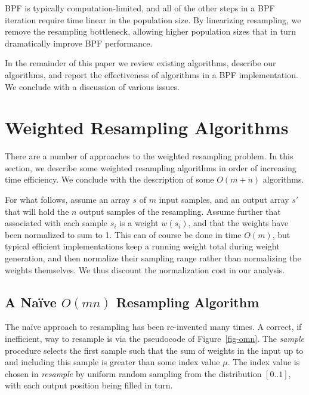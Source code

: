 \documentclass[12pt]{article}
\begin{document}
  BPF is typically computation-limited, and all of the other
  steps in a BPF iteration require time linear in the
  population size.  By linearizing resampling, we remove the
  resampling bottleneck, allowing higher population
  sizes that in turn dramatically improve BPF performance.

  In the remainder of this paper we review existing
  algorithms, describe our algorithms, and report the
  effectiveness of algorithms in a BPF implementation.  We
  conclude with a discussion of various issues.

\section{Weighted Resampling Algorithms}

  There are a number of approaches to the weighted
  resampling problem.  In this section, we describe some
  weighted resampling algorithms in order of increasing time
  efficiency.  We conclude with the description of some
  $O(m + n)$ algorithms.

  For what follows, assume an array $s$ of $m$ input
  samples, and an output array $s'$ that will hold the $n$
  output samples of the resampling.  Assume further that
  associated with each sample $s_i$ is a weight $w(s_i)$,
  and that the weights have been normalized to sum to 1.
  This can of course be done in time $O(m)$, but typical
  efficient implementations keep a running weight total
  during weight generation, and then normalize their
  sampling range rather than normalizing the weights
  themselves.  We thus discount the normalization cost in
  our analysis.

\subsection{A Na\"ive $O(mn)$ Resampling Algorithm}\label{sec-naive}

  The na\"ive approach to resampling has been re-invented
  many times.  A correct, if inefficient, way to resample is
  via the pseudocode of Figure~\ref{fig-omn}.  The {\em
  sample} procedure selects the first sample such that the
  sum of weights in the input up to and including this
  sample is greater than some index value $\mu$.  The index
  value is chosen in {\em resample} by uniform random
  sampling from the distribution $[0..1]$, with each output
  position being filled in turn.
\end{document}
